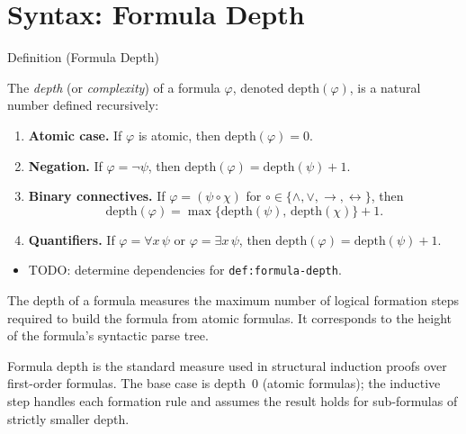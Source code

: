 
\section{Syntax: Formula Depth}


\begin{definitionbox}{Definition (Formula Depth)}
\begin{definition}\label{def:formula-depth}
The \emph{depth} (or \emph{complexity}) of a formula $\varphi$, denoted
$\mathrm{depth}(\varphi)$, is a natural number defined recursively:
\begin{enumerate}
  \item \textbf{Atomic case.} If $\varphi$ is atomic, then $\mathrm{depth}(\varphi) = 0$.

  \item \textbf{Negation.} If $\varphi = \neg \psi$, then
  $\mathrm{depth}(\varphi) = \mathrm{depth}(\psi) + 1$.

  \item \textbf{Binary connectives.} If $\varphi = (\psi \circ \chi)$
  for $\circ \in \{\wedge,\vee,\rightarrow,\leftrightarrow\}$, then
  \[
  \mathrm{depth}(\varphi) = \max\{\mathrm{depth}(\psi),\,\mathrm{depth}(\chi)\} + 1.
  \]

  \item \textbf{Quantifiers.} If $\varphi = \forall x\,\psi$ or $\varphi = \exists x\,\psi$,
  then $\mathrm{depth}(\varphi) = \mathrm{depth}(\psi) + 1$.
\end{enumerate}
\end{definition}
\end{definitionbox}

\begin{dependencies}
\begin{itemize}
  \item TODO: determine dependencies for \texttt{def:formula-depth}.
\end{itemize}
\end{dependencies}

\begin{remark*}
The depth of a formula measures the maximum number of logical formation steps
required to build the formula from atomic formulas. It corresponds to the height
of the formula's syntactic parse tree.
\end{remark*}

\begin{remark*}
Formula depth is the standard measure used in structural induction proofs over
first-order formulas. The base case is depth~$0$ (atomic formulas); the
inductive step handles each formation rule and assumes the result holds for
sub-formulas of strictly smaller depth.
\end{remark*}

